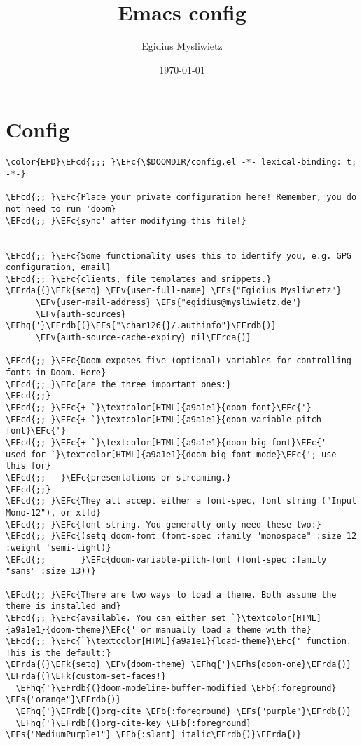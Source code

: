 \documentclass[a4wide,10pt]{article}
\author{Egidius Mysliwietz}
\date{\today}
\title{Emacs config}
\newcommand{\EFc}[1]{\textcolor{EFc}{#1}} %
\newcommand{\EFcd}[1]{\textcolor{EFcd}{#1}} %
\newcommand{\EFs}[1]{\textcolor{EFs}{#1}} %
\newcommand{\EFk}[1]{\textcolor{EFk}{#1}} %
\newcommand{\EFb}[1]{\textcolor{EFb}{#1}} %
\newcommand{\EFv}[1]{\textcolor{EFv}{#1}} %
\newcommand{\EFhq}[1]{\textcolor{EFhq}{#1}} %
\newcommand{\EFhs}[1]{\textcolor{EFhs}{#1}} %
\newcommand{\EFrda}[1]{\textcolor{EFrda}{#1}} %
\newcommand{\EFrdb}[1]{\textcolor{EFrdb}{#1}} %
\begin{document}
\maketitle
\tableofcontents


\section{Config}
\label{sec:org00a1e10}
\begin{Code}
\begin{Verbatim}
\color{EFD}\EFcd{;;; }\EFc{\$DOOMDIR/config.el -*- lexical-binding: t; -*-}

\EFcd{;; }\EFc{Place your private configuration here! Remember, you do not need to run 'doom}
\EFcd{;; }\EFc{sync' after modifying this file!}


\EFcd{;; }\EFc{Some functionality uses this to identify you, e.g. GPG configuration, email}
\EFcd{;; }\EFc{clients, file templates and snippets.}
\EFrda{(}\EFk{setq} \EFv{user-full-name} \EFs{"Egidius Mysliwietz"}
      \EFv{user-mail-address} \EFs{"egidius@mysliwietz.de"}
      \EFv{auth-sources} \EFhq{'}\EFrdb{(}\EFs{"\char126{}/.authinfo"}\EFrdb{)}
      \EFv{auth-source-cache-expiry} nil\EFrda{)}

\EFcd{;; }\EFc{Doom exposes five (optional) variables for controlling fonts in Doom. Here}
\EFcd{;; }\EFc{are the three important ones:}
\EFcd{;;}
\EFcd{;; }\EFc{+ `}\textcolor[HTML]{a9a1e1}{doom-font}\EFc{'}
\EFcd{;; }\EFc{+ `}\textcolor[HTML]{a9a1e1}{doom-variable-pitch-font}\EFc{'}
\EFcd{;; }\EFc{+ `}\textcolor[HTML]{a9a1e1}{doom-big-font}\EFc{' -- used for `}\textcolor[HTML]{a9a1e1}{doom-big-font-mode}\EFc{'; use this for}
\EFcd{;;   }\EFc{presentations or streaming.}
\EFcd{;;}
\EFcd{;; }\EFc{They all accept either a font-spec, font string ("Input Mono-12"), or xlfd}
\EFcd{;; }\EFc{font string. You generally only need these two:}
\EFcd{;; }\EFc{(setq doom-font (font-spec :family "monospace" :size 12 :weight 'semi-light)}
\EFcd{;;       }\EFc{doom-variable-pitch-font (font-spec :family "sans" :size 13))}

\EFcd{;; }\EFc{There are two ways to load a theme. Both assume the theme is installed and}
\EFcd{;; }\EFc{available. You can either set `}\textcolor[HTML]{a9a1e1}{doom-theme}\EFc{' or manually load a theme with the}
\EFcd{;; }\EFc{`}\textcolor[HTML]{a9a1e1}{load-theme}\EFc{' function. This is the default:}
\EFrda{(}\EFk{setq} \EFv{doom-theme} \EFhq{'}\EFhs{doom-one}\EFrda{)}
\EFrda{(}\EFk{custom-set-faces!}
  \EFhq{'}\EFrdb{(}doom-modeline-buffer-modified \EFb{:foreground} \EFs{"orange"}\EFrdb{)}
  \EFhq{'}\EFrdb{(}org-cite \EFb{:foreground} \EFs{"purple"}\EFrdb{)}
  \EFhq{'}\EFrdb{(}org-cite-key \EFb{:foreground} \EFs{"MediumPurple1"} \EFb{:slant} italic\EFrdb{)}\EFrda{)}



\end{Verbatim}
\end{Code}
\end{document}
